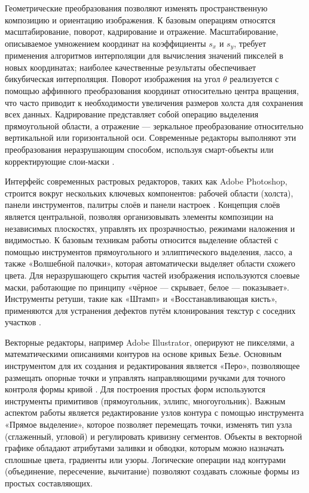 \documentclass{SibFU-docs}
\begin{document}
Геометрические преобразования позволяют изменять пространственную композицию и ориентацию изображения. К базовым операциям относятся масштабирование, поворот, кадрирование и отражение. Масштабирование, описываемое умножением координат на коэффициенты $s_x$ и $s_y$, требует применения алгоритмов интерполяции для вычисления значений пикселей в новых координатах; наиболее качественные результаты обеспечивает бикубическая интерполяция. Поворот изображения на угол $\theta$ реализуется с помощью аффинного преобразования координат относительно центра вращения, что часто приводит к необходимости увеличения размеров холста для сохранения всех данных. Кадрирование представляет собой операцию выделения прямоугольной области, а отражение — зеркальное преобразование относительно вертикальной или горизонтальной оси. Современные редакторы выполняют эти преобразования неразрушающим способом, используя смарт-объекты или корректирующие слои-маски \cite{rucomp}.


Интерфейс современных растровых редакторов, таких как Adobe Photoshop, строится вокруг нескольких ключевых компонентов: рабочей области (холста), панели инструментов, палитры слоёв и панели настроек \cite{adobe-helpx}. Концепция слоёв является центральной, позволяя организовывать элементы композиции на независимых плоскостях, управлять их прозрачностью, режимами наложения и видимостью. К базовым техникам работы относится выделение областей с помощью инструментов прямоугольного и эллиптического выделения, лассо, а также «Волшебной палочки», которая автоматически выделяет области схожего цвета. Для неразрушающего скрытия частей изображения используются слоевые маски, работающие по принципу «чёрное — скрывает, белое — показывает». Инструменты ретуши, такие как «Штамп» и «Восстанавливающая кисть», применяются для устранения дефектов путём клонирования текстур с соседних участков \cite{gimp-docs}.


Векторные редакторы, например Adobe Illustrator, оперируют не пикселями, а математическими описаниями контуров на основе кривых Безье. Основным инструментом для их создания и редактирования является «Перо», позволяющее размещать опорные точки и управлять направляющими ручками для точного контроля формы кривой \cite{adobe-helpx}. Для построения простых форм используются инструменты примитивов (прямоугольник, эллипс, многоугольник). Важным аспектом работы является редактирование узлов контура с помощью инструмента «Прямое выделение», которое позволяет перемещать точки, изменять тип узла (сглаженный, угловой) и регулировать кривизну сегментов. Объекты в векторной графике обладают атрибутами заливки и обводки, которым можно назначать сплошные цвета, градиенты или узоры. Логические операции над контурами (объединение, пересечение, вычитание) позволяют создавать сложные формы из простых составляющих.
\end{document}
